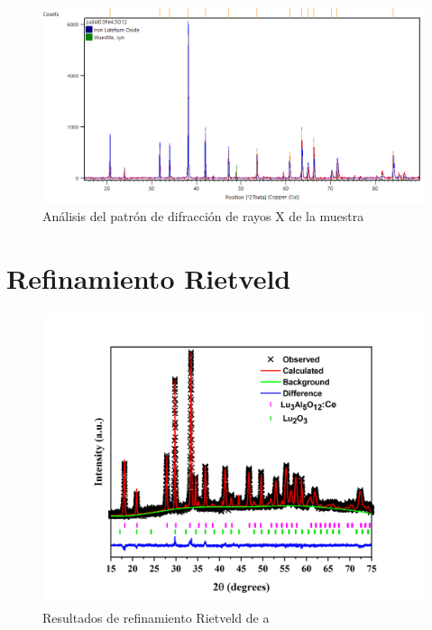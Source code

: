\begin{appendix}
	\begin{figure}[t!]
		\centering%
		\includegraphics[width=\textwidth]{Anexos/x=45.png}%
		\caption{Análisis del patrón de difracción de rayos X de la muestra
		} \label{fig:XpertX45}
	\end{figure}

	\chapter{Refinamiento Rietveld}\label{AnexoB}

	\begin{figure}[h]
		\centering%
		\includegraphics[width=12cm]{Anexos/x00.png}%
		\caption{Resultados de refinamiento Rietveld de a }
		\label{fig:Refi00}
	\end{figure}


\end{appendix}
